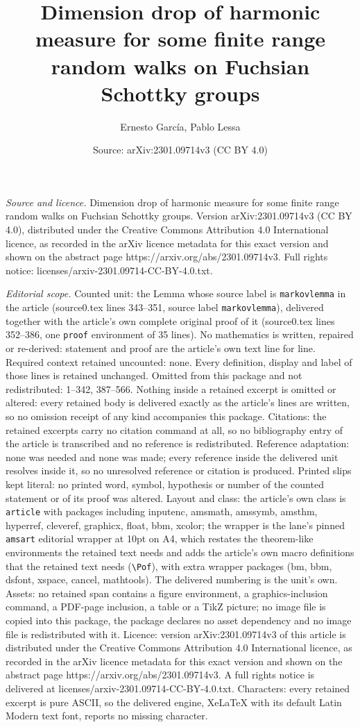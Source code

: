 \documentclass[10pt,a4paper]{amsart}
\title[Dimension drop of harmonic measure for some finite range ran]{Dimension drop of harmonic measure for some finite range random walks on Fuchsian Schottky groups}
\author{Ernesto Garc\'ia, Pablo Lessa}
\date{Source: arXiv:2301.09714v3 (CC BY 4.0)}
\begin{document}
\maketitle

\noindent\emph{Source and licence.} Dimension drop of harmonic measure for some finite range random walks on Fuchsian Schottky groups. Version arXiv:2301.09714v3 (CC BY 4.0), distributed under the Creative Commons Attribution 4.0 International licence, as recorded in the arXiv licence metadata for this exact version and shown on the abstract page https://arxiv.org/abs/2301.09714v3. Full rights notice: licenses/arxiv-2301.09714-CC-BY-4.0.txt.\par\smallskip

\noindent\textit{Editorial scope.} Counted unit: the Lemma whose source label is \texttt{markovlemma} in the article (source0.tex lines 343--351, source label \texttt{markovlemma}), delivered together with the article's own complete original proof of it (source0.tex lines 352--386, one \texttt{proof} environment of 35 lines). No mathematics is written, repaired or re-derived: statement and proof are the article's own text line for line. Required context retained uncounted: none. Every definition, display and label of those lines is retained unchanged. Omitted from this package and not redistributed: 1--342, 387--566. Nothing inside a retained excerpt is omitted or altered: every retained body is delivered exactly as the article's lines are written, so no omission receipt of any kind accompanies this package. Citations: the retained excerpts carry no citation command at all, so no bibliography entry of the article is transcribed and no reference is redistributed. Reference adaptation: none was needed and none was made; every reference inside the delivered unit resolves inside it, so no unresolved reference or citation is produced. Printed slips kept literal: no printed word, symbol, hypothesis or number of the counted statement or of its proof was altered. Layout and class: the article's own class is \texttt{article} with packages including inputenc, amsmath, amssymb, amsthm, hyperref, cleveref, graphicx, float, bbm, xcolor; the wrapper is the lane's pinned \texttt{amsart} editorial wrapper at 10pt on A4, which restates the theorem-like environments the retained text needs and adds the article's own macro definitions that the retained text needs (\texttt{\textbackslash Pof}), with extra wrapper packages (bm, bbm, dsfont, xspace, cancel, mathtools). The delivered numbering is the unit's own. Assets: no retained span contains a figure environment, a graphics-inclusion command, a PDF-page inclusion, a table or a TikZ picture; no image file is copied into this package, the package declares no asset dependency and no image file is redistributed with it. Licence: version arXiv:2301.09714v3 of this article is distributed under the Creative Commons Attribution 4.0 International licence, as recorded in the arXiv licence metadata for this exact version and shown on the abstract page https://arxiv.org/abs/2301.09714v3. A full rights notice is delivered at licenses/arxiv-2301.09714-CC-BY-4.0.txt. Characters: every retained excerpt is pure ASCII, so the delivered engine, XeLaTeX with its default Latin Modern text font, reports no missing character.
\end{document}
